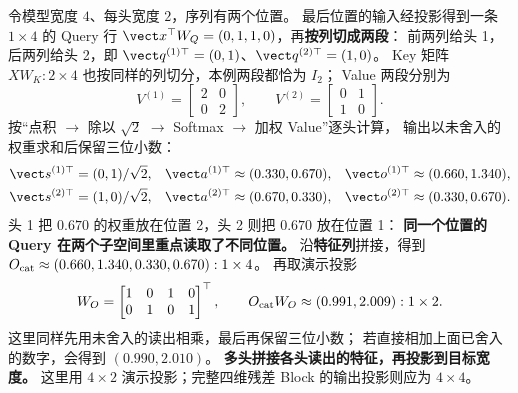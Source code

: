 令模型宽度 $4$、每头宽度 $2$，序列有两个位置。
最后位置的输入经投影得到一条 $1\times4$ 的 Query 行
$\vect x^\top W_Q=(0,1,1,0)$，再\textbf{按列切成两段}：
前两列给头 1，后两列给头 2，即
$\vect q^{(1)\top}=(0,1)$、$\vect q^{(2)\top}=(1,0)$。
Key 矩阵 $XW_K:2\times4$ 也按同样的列切分，本例两段都恰为 $I_2$；
Value 两段分别为
\[
V^{(1)}=\begin{bmatrix}2&0\\0&2\end{bmatrix},
\qquad
V^{(2)}=\begin{bmatrix}0&1\\1&0\end{bmatrix}.
\]
按“点积 $\to$ 除以 $\sqrt2$ $\to$ Softmax $\to$ 加权 Value”逐头计算，
输出以未舍入的权重求和后保留三位小数：
\[
\begin{aligned}
\vect s^{(1)\top}&=(0,1)/\sqrt2,&
\vect a^{(1)\top}&\approx(0.330,0.670),&
\vect o^{(1)\top}&\approx(0.660,1.340),\\
\vect s^{(2)\top}&=(1,0)/\sqrt2,&
\vect a^{(2)\top}&\approx(0.670,0.330),&
\vect o^{(2)\top}&\approx(0.330,0.670).
\end{aligned}
\]
头 1 把 $0.670$ 的权重放在位置 2，头 2 则把 $0.670$ 放在位置 1：
\textbf{同一个位置的 Query 在两个子空间里重点读取了不同位置。}
沿\textbf{特征列}拼接，得到
$O_{\rm cat}\approx(0.660,1.340,0.330,0.670):1\times4$。
再取演示投影
\[
W_O=\begin{bmatrix}1&0&1&0\\0&1&0&1\end{bmatrix}^{\top},
\qquad O_{\rm cat}W_O\approx(0.991,2.009):1\times2.
\]
这里同样先用未舍入的读出相乘，最后再保留三位小数；
若直接相加上面已舍入的数字，会得到 $(0.990,2.010)$。
\textbf{多头拼接各头读出的特征，再投影到目标宽度。}
这里用 $4\times2$ 演示投影；完整四维残差 Block 的输出投影则应为 $4\times4$。



\endgroup

